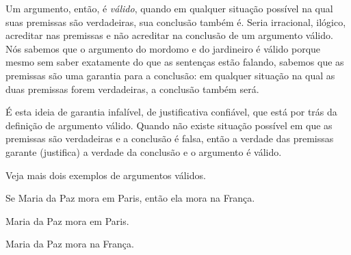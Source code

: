 Um argumento, então, é \emph{válido}, quando em qualquer situação possível na qual suas premissas são verdadeiras, sua conclusão também é.
Seria irracional, ilógico, acreditar nas premissas e não acreditar na conclusão de um argumento válido.
Nós sabemos que o argumento do mordomo e do jardineiro é válido porque mesmo sem saber exatamente do que as sentenças estão falando, sabemos que as premissas são uma garantia para a conclusão:
em qualquer situação na qual as duas premissas forem verdadeiras, a conclusão também será.

É esta ideia de garantia infalível, de justificativa confiável, que está por trás da definição de argumento válido.
Quando não existe situação possível em que as premissas são verdadeiras e a conclusão é falsa, então a verdade das premissas garante (justifica) a verdade da conclusão e o argumento é válido.

Veja mais dois exemplos de argumentos válidos.
\begin{earg}\label{ValidoMaria}
	\item[] Se Maria da Paz mora em Paris, então ela mora na França.
	\item[] Maria da Paz mora em Paris.
	\item[\therefore] Maria da Paz mora na França.
\end{earg}

